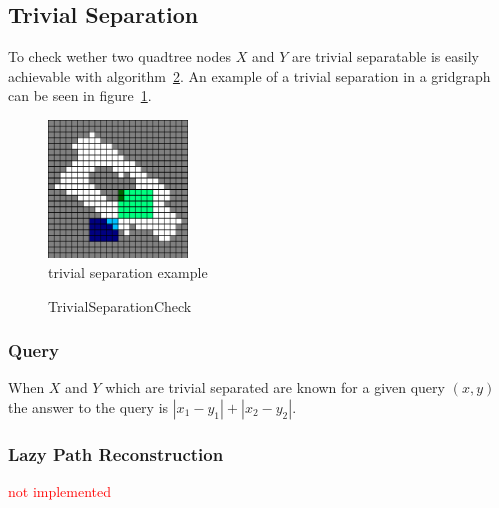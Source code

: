 \documentclass{article}
\begin{document}
\subsection{Trivial Separation}
To check wether two quadtree nodes $X$ and $Y$ are trivial separatable is easily achievable with algorithm~\ref{alg:TrivialSeparationCheck}.
An example of a trivial separation in a gridgraph can be seen in figure~\ref{pic:TrivialSeparation}.

\begin{figure}[ht!]
  \centering
  \includegraphics[width=0.33\textwidth]{TrivialSeparation.png}
  \caption{trivial separation example}
  \label{pic:TrivialSeparation}
\end{figure}


\begin{figure}[ht!]
  \begin{algorithm}[H]
    \caption{TrivialSeparationCheck}
    \label{alg:TrivialSeparationCheck}
  \end{algorithm}
\end{figure}

\subsubsection*{Query}
When $X$ and $Y$ which are trivial separated are known for a given query $(x, y)$ the answer to the query is $|x_1 - y_1| + |x_2 - y_2|$.

\subsubsection{Lazy Path Reconstruction}
\textcolor{red}{not implemented\\}
\end{document}
